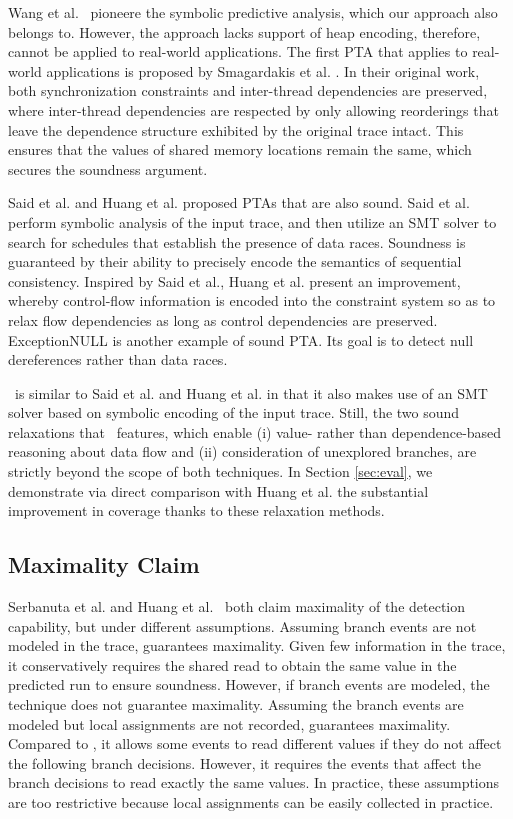 Wang et al.~\cite{chao} pioneere the symbolic predictive analysis, 
which our approach also belongs to. However, the approach lacks support 
of heap encoding, therefore, cannot be applied to real-world applications. 
The first PTA that applies to real-world applications is proposed by 
Smagardakis et al. \cite{yannis}. In their original work, both synchronization 
constraints and inter-thread dependencies are preserved, where inter-thread 
dependencies are respected by only allowing reorderings that leave the 
dependence structure exhibited by the original trace intact. This ensures 
that the values of shared memory locations remain the same, which secures 
the soundness argument.

Said et al. \cite{Said:2011} and Huang et al. \cite{pldi14} proposed
PTAs that are also sound. Said et al. perform symbolic analysis of the 
input trace, and then utilize an SMT solver to search for schedules that 
establish the presence of data races. Soundness is guaranteed by their 
ability to precisely encode the semantics of sequential consistency. 
Inspired by Said et al., Huang et al. present an improvement, whereby 
control-flow information is encoded into the constraint system so as 
to relax flow dependencies as long as control dependencies are 
preserved. ExceptionNULL \cite{Farzan:2012} is another example of 
sound PTA. Its goal is to detect null dereferences rather than data races. 

\tool\ is similar to Said et al. and Huang et al. in that it also makes 
use of an SMT solver based on symbolic encoding of the input 
trace. Still, the two sound relaxations that \tool\ features, which 
enable (i) value- rather than dependence-based reasoning about data 
flow and (ii) consideration of unexplored branches, are strictly beyond
the scope of both techniques. In Section \ref{sec:eval}, we demonstrate 
via direct comparison with Huang et al. the substantial improvement 
in coverage thanks to these relaxation methods.

\subsection{Maximality Claim}
Serbanuta et al. \cite{maximal} and Huang et al.~\cite{pldi14} both 
claim maximality of the detection capability, but under different assumptions. 
Assuming branch events are not modeled in the trace, \cite{maximal} guarantees maximality. Given few 
information in the trace, it conservatively requires the shared read to 
obtain the same value in the predicted run to ensure soundness. However, if 
branch events are modeled, the technique does not guarantee maximality.  
Assuming the branch events are modeled but local assignments are not recorded, 
\cite{pldi14} guarantees maximality. 
Compared to \cite{maximal}, it allows some events to read different 
values if they do not affect the following branch decisions. However, 
it requires the events that affect the branch decisions to read exactly 
the same values. In practice, these assumptions are too restrictive  
because local assignments can be easily collected in practice.

